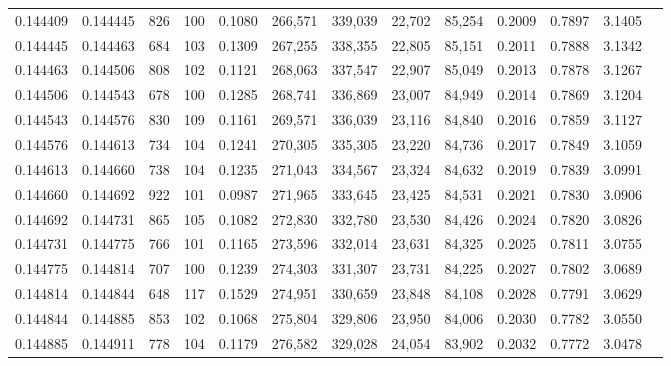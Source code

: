\begin{tabular}{rrrrrrrrrrrrr}
0.144409 & 0.144445 &   826 & 100 &                                     0.1080 & 266,571 & 339,039 &  22,702 &  85,254 & 0.2009 & 0.7897 & 3.1405 \\
0.144445 & 0.144463 &   684 & 103 &                                     0.1309 & 267,255 & 338,355 &  22,805 &  85,151 & 0.2011 & 0.7888 & 3.1342 \\
0.144463 & 0.144506 &   808 & 102 &                                     0.1121 & 268,063 & 337,547 &  22,907 &  85,049 & 0.2013 & 0.7878 & 3.1267 \\
0.144506 & 0.144543 &   678 & 100 &                                     0.1285 & 268,741 & 336,869 &  23,007 &  84,949 & 0.2014 & 0.7869 & 3.1204 \\
0.144543 & 0.144576 &   830 & 109 &                                     0.1161 & 269,571 & 336,039 &  23,116 &  84,840 & 0.2016 & 0.7859 & 3.1127 \\
0.144576 & 0.144613 &   734 & 104 &                                     0.1241 & 270,305 & 335,305 &  23,220 &  84,736 & 0.2017 & 0.7849 & 3.1059 \\
0.144613 & 0.144660 &   738 & 104 &                                     0.1235 & 271,043 & 334,567 &  23,324 &  84,632 & 0.2019 & 0.7839 & 3.0991 \\
0.144660 & 0.144692 &   922 & 101 &                                     0.0987 & 271,965 & 333,645 &  23,425 &  84,531 & 0.2021 & 0.7830 & 3.0906 \\
0.144692 & 0.144731 &   865 & 105 &                                     0.1082 & 272,830 & 332,780 &  23,530 &  84,426 & 0.2024 & 0.7820 & 3.0826 \\
0.144731 & 0.144775 &   766 & 101 &                                     0.1165 & 273,596 & 332,014 &  23,631 &  84,325 & 0.2025 & 0.7811 & 3.0755 \\
0.144775 & 0.144814 &   707 & 100 &                                     0.1239 & 274,303 & 331,307 &  23,731 &  84,225 & 0.2027 & 0.7802 & 3.0689 \\
0.144814 & 0.144844 &   648 & 117 &                                     0.1529 & 274,951 & 330,659 &  23,848 &  84,108 & 0.2028 & 0.7791 & 3.0629 \\
0.144844 & 0.144885 &   853 & 102 &                                     0.1068 & 275,804 & 329,806 &  23,950 &  84,006 & 0.2030 & 0.7782 & 3.0550 \\
0.144885 & 0.144911 &   778 & 104 &                                     0.1179 & 276,582 & 329,028 &  24,054 &  83,902 & 0.2032 & 0.7772 & 3.0478 \\

\end{tabular}
